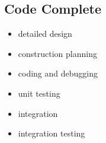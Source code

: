 \subsection{Code Complete}

\begin{itemize}
    \item detailed design
    \item construction planning
    \item coding and debugging
    \item unit testing
    \item integration
    \item integration testing
\end{itemize}